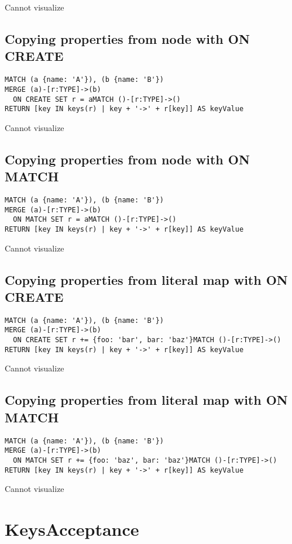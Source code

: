 Cannot visualize
\subsection{Copying properties from node with ON CREATE}

\begin{lstlisting}
MATCH (a {name: 'A'}), (b {name: 'B'})
MERGE (a)-[r:TYPE]->(b)
  ON CREATE SET r = aMATCH ()-[r:TYPE]->()
RETURN [key IN keys(r) | key + '->' + r[key]] AS keyValue
\end{lstlisting}

Cannot visualize
\subsection{Copying properties from node with ON MATCH}

\begin{lstlisting}
MATCH (a {name: 'A'}), (b {name: 'B'})
MERGE (a)-[r:TYPE]->(b)
  ON MATCH SET r = aMATCH ()-[r:TYPE]->()
RETURN [key IN keys(r) | key + '->' + r[key]] AS keyValue
\end{lstlisting}

Cannot visualize
\subsection{Copying properties from literal map with ON CREATE}

\begin{lstlisting}
MATCH (a {name: 'A'}), (b {name: 'B'})
MERGE (a)-[r:TYPE]->(b)
  ON CREATE SET r += {foo: 'bar', bar: 'baz'}MATCH ()-[r:TYPE]->()
RETURN [key IN keys(r) | key + '->' + r[key]] AS keyValue
\end{lstlisting}

Cannot visualize
\subsection{Copying properties from literal map with ON MATCH}

\begin{lstlisting}
MATCH (a {name: 'A'}), (b {name: 'B'})
MERGE (a)-[r:TYPE]->(b)
  ON MATCH SET r += {foo: 'baz', bar: 'baz'}MATCH ()-[r:TYPE]->()
RETURN [key IN keys(r) | key + '->' + r[key]] AS keyValue
\end{lstlisting}

Cannot visualize
\section{KeysAcceptance}

